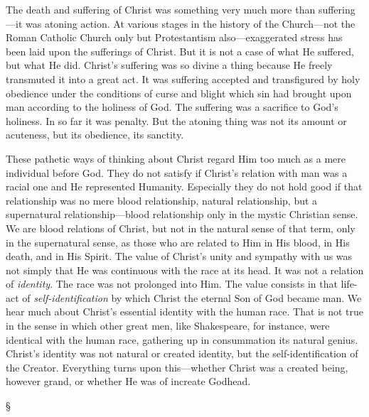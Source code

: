 \documentclass[12pt,letterpaper,oneside]{book}
\begin{document}
The death and suffering of Christ was something 
very much more than suffering---it was 
atoning action. At various stages in the history 
of the Church---not the Roman Catholic Church 
only but Protestantism also---exaggerated stress 
has been laid upon the sufferings of Christ. 
But it is not a case of what He suffered, but 
what He did. Christ's suffering was so divine 
a thing because He freely transmuted it into a 
great act. It was suffering accepted and transfigured 
by holy obedience under the conditions 
of curse and blight which sin had brought upon 
man according to the holiness of God. The 
suffering was a sacrifice to God's holiness. In 
so far it was penalty. But the atoning thing 
was not its amount or acuteness, but its 
obedience, its sanctity. 


These pathetic ways of thinking about Christ 
regard Him too much as a mere individual 
before God. They do not satisfy if Christ's 
relation with man was a racial one and He 
represented Humanity. Especially they do not 
hold good if that relationship was no mere 
blood relationship, natural relationship, but a 
supernatural relationship---blood relationship 
only in the mystic Christian sense. We are 
blood relations of Christ, but not in the natural 
sense of that term, only in the supernatural 
sense, as those who are related to Him in His 
blood, in His death, and in His Spirit. The 
value of Christ's unity and sympathy with us 
was not simply that He was continuous with 
the race at its head. It was not a relation 
of \textit{identity}. The race was not prolonged into 
Him. The value consists in that life-act of \textit{self-identification} 
by which Christ the eternal Son of 
God became man. We hear much about Christ's 
essential identity with the human race. That is 
not true in the sense in which other great men, 
like Shakespeare, for instance, were identical 
with the human race, gathering up in consummation 
its natural genius. Christ's identity was 
not natural or created identity, but the self-identification 
of the Creator. Everything turns 
upon this---whether Christ was a created being, 
however grand, or whether He was of increate 
Godhead. 

\begin{center}
\S
\end{center}
\end{document}
